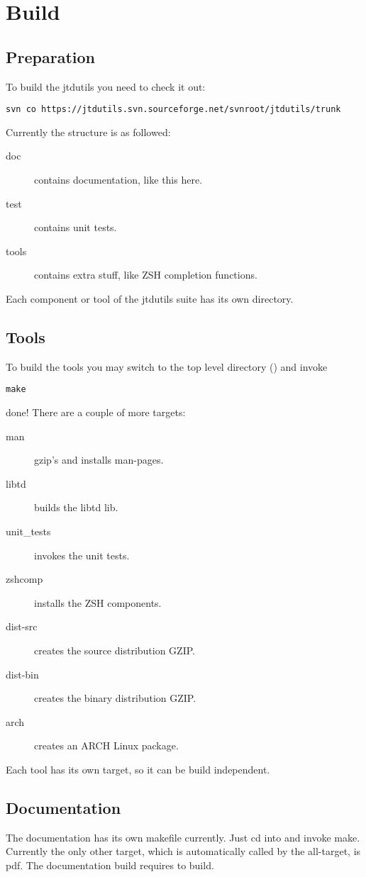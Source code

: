 \section{Build}

\subsection{Preparation}
To build the jtdutils you need to check it out:
\begin{lstlisting}
svn co https://jtdutils.svn.sourceforge.net/svnroot/jtdutils/trunk
\end{lstlisting}

Currently the structure is as followed:
\begin{description}
\item[doc] contains documentation, like this here.
\item[test] contains unit tests.
\item[tools] contains extra stuff, like ZSH completion functions.
\end{description}

Each component or tool of the jtdutils suite has its own directory.

\subsection{Tools}

To build the tools you may switch to the top level directory ()
and invoke
\begin{lstlisting}
make
\end{lstlisting}

done! 
There are a couple of more targets:
\begin{description}
\item[man] gzip's and installs man-pages.
\item[libtd] builds the libtd lib.
\item[unit\_tests] invokes the unit tests.
\item[zshcomp] installs the ZSH components.
\item[dist-src] creates the source distribution GZIP.
\item[dist-bin] creates the binary distribution GZIP.
\item[arch] creates an ARCH Linux package.
\end{description}

Each tool has its own target, so it can be build independent.

\subsection{Documentation}

The documentation has its own makefile currently. 
Just cd into  and invoke make. 
Currently the only other target, which is automatically called by the all-target, is pdf.
The documentation build requires  to build.
